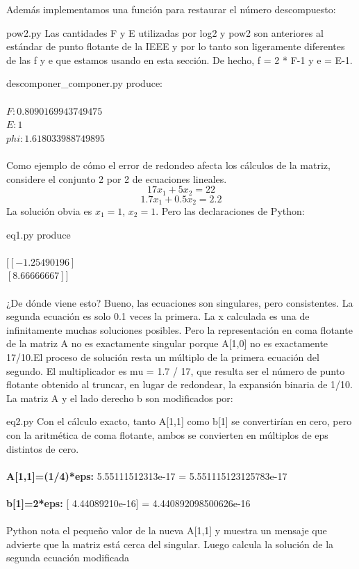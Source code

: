 \documentclass[12pt]{article}
\begin{document}
Adem\'as implementamos una funci\'on para restaurar el n\'umero descompuesto:

{pow2.py}
Las cantidades F y E utilizadas por log2 y pow2 son anteriores al estándar de punto flotante de la IEEE y por lo tanto son ligeramente diferentes de las f y e que estamos usando en esta
sección. De hecho, f = 2 * F-1 y e = E-1.

{descomponer_componer.py}
produce:\\\\
$F: 0.8090169943749475$\\
$E: 1$\\
$phi: 1.618033988749895$\\\\
Como ejemplo de cómo el error de redondeo afecta los cálculos de la matriz, considere el
conjunto 2 por 2 de ecuaciones lineales.
$$17x_1+5x_2=22$$
$$1.7x_1+0.5x_2=2.2$$
La solución obvia es $x_1 = 1$, $x_2 = 1$. Pero las declaraciones de Python:

{eq1.py}
produce\\\\
$[[-1.25490196]$\\
$[8.66666667]]$\\\\
¿De dónde viene esto? Bueno, las ecuaciones son singulares, pero consistentes. La
segunda ecuación es solo 0.1 veces la primera. La x calculada es una de infinitamente
muchas soluciones posibles. Pero la representación en coma flotante de la matriz A no es
exactamente singular porque A[1,0] no es exactamente 17/10.El proceso de solución resta un múltiplo de la primera ecuación del segundo. El multiplicador
es mu = 1.7 / 17, que resulta ser el número de punto flotante obtenido al truncar, en lugar de
redondear, la expansión binaria de 1/10. La matriz A y el lado derecho b son modificados por:

{eq2.py}
Con el cálculo exacto, tanto A[1,1] como b[1] se convertirían en cero, pero con la aritmética
de coma flotante, ambos se convierten en múltiplos de eps distintos de cero.\\\\
\textbf{A[1,1]=(1/4)*eps:} 5.55111512313e-17 = 5.551115123125783e-17\\\\
\textbf{b[1]=2*eps:} [  4.44089210e-16] = 4.440892098500626e-16\\\\
Python nota el pequeño valor de la nueva A[1,1] y muestra un mensaje que advierte que la
matriz está cerca del singular. Luego calcula la solución de la segunda ecuación modificada
\end{document}
